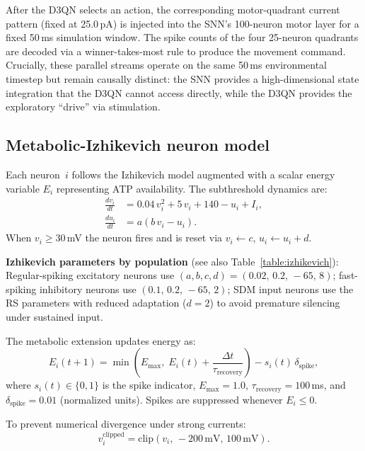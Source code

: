 \documentclass[journal,twocolumn]{IEEEtran}
\begin{document}
After the D3QN selects an action, the corresponding motor-quadrant
current pattern (fixed at 25.0\,pA) is injected into the SNN's 100-neuron motor
layer for a fixed 50\,ms simulation window.  The spike counts of the
four 25-neuron quadrants are decoded via a winner-takes-most rule to
produce the movement command.  Crucially, these parallel streams
operate on the same 50\,ms environmental timestep but remain
causally distinct: the SNN provides a high-dimensional state
integration that the D3QN cannot access directly, while the D3QN
provides the exploratory ``drive'' via stimulation.

\subsection{Metabolic-Izhikevich neuron model}

Each neuron~$i$ follows the Izhikevich model \cite{Izhikevich2003simple}
augmented with a scalar energy variable $E_i$ representing ATP
availability.  The subthreshold dynamics are:
\begin{align}
\frac{dv_i}{dt} &= 0.04\,v_i^{2} + 5\,v_i + 140 - u_i + I_i,
  \label{eq:izh_v}\\
\frac{du_i}{dt} &= a\!\left(b\,v_i - u_i\right).
\end{align}
When $v_i \geq 30$\,mV the neuron fires and is reset via
$v_i \leftarrow c$, $u_i \leftarrow u_i + d$.

\textbf{Izhikevich parameters by population} (see also
Table~\ref{table:izhikevich}): Regular-spiking excitatory neurons use
$(a,b,c,d) = (0.02,\,0.2,\,-65,\,8)$; fast-spiking inhibitory neurons
use $(0.1,\,0.2,\,-65,\,2)$; SDM input neurons use the RS parameters
with reduced adaptation ($d = 2$) to avoid premature silencing under
sustained input.

The metabolic extension updates energy as:
\begin{equation}
E_i(t{+}1) = \min\!\left(E_{\max},\;
  E_i(t) + \frac{\Delta t}{\tau_{\mathrm{recovery}}}\right)
  - s_i(t)\,\delta_{\mathrm{spike}},
\label{eq:energy}
\end{equation}
where $s_i(t) \in \{0,1\}$ is the spike indicator, $E_{\max} = 1.0$,
$\tau_{\mathrm{recovery}} = 100$\,ms, and
$\delta_{\mathrm{spike}} = 0.01$ (normalized units).  Spikes are
suppressed whenever $E_i \leq 0$.

To prevent numerical divergence under strong currents:
\begin{equation}
v_i^{\mathrm{clipped}} =
  \mathrm{clip}\!\left(v_i,\,-200\,\text{mV},\,100\,\text{mV}\right).
\label{eq:clip}
\end{equation}
\end{document}
